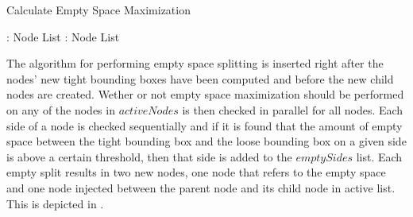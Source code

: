 \begin{algorithm}
  \caption{Calculate Empty Space Maximization}
  \label{alg:emptySpaceMaximizing}
  \begin{algorithmic}
               { : Node List}
               { : Node List}{


                 \STATE{}
                     \ENDIF
                   \ENDFOR
                 \ENDFOR
                 \ENDFOR
                 \ENDIF

                 \STATE{}

  }
  \end{algorithmic}
\end{algorithm}


The algorithm for performing empty space splitting is inserted right after the
nodes' new tight bounding boxes have been computed and before the new child
nodes are created. Wether or not empty space maximization should be performed on
any of the nodes in $activeNodes$ is then checked in parallel for all
nodes. Each side of a node is checked sequentially and if it is found that the
amount of empty space between the tight bounding box and the loose bounding box
on a given side is above a certain threshold, then that side is added to the
$emptySides$ list. Each empty split results in two new nodes, one node that
refers to the empty space and one node injected between the parent node and its
child node in active list. This is depicted in .

